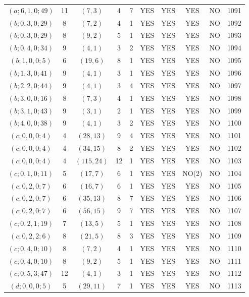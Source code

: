 \begin{longtable}{|c|c|c|c|c|c|c|c|c|c|}
$(a; 6, 1, 0; 49)$ & 11 & $(7, 3)$ & 4 & 7 & YES & YES & YES & NO & 1091\\
$(b; 0, 3, 0; 29)$ & 8 & $(7, 2)$ & 4 & 1 & YES & YES & YES & NO & 1092\\
$(b; 0, 3, 0; 29)$ & 8 & $(9, 2)$ & 5 & 1 & YES & YES & YES & NO & 1093\\
$(b; 0, 4, 0; 34)$ & 9 & $(4, 1)$ & 3 & 2 & YES & YES & YES & NO & 1094\\
$(b; 1, 0, 0; 5)$ & 6 & $(19, 6)$ & 8 & 1 & YES & YES & YES & NO & 1095\\
$(b; 1, 3, 0; 41)$ & 9 & $(4, 1)$ & 3 & 1 & YES & YES & YES & NO & 1096\\
$(b; 2, 2, 0; 44)$ & 9 & $(4, 1)$ & 3 & 4 & YES & YES & YES & NO & 1097\\
$(b; 3, 0, 0; 16)$ & 8 & $(7, 3)$ & 4 & 1 & YES & YES & YES & NO & 1098\\
$(b; 3, 1, 0; 43)$ & 9 & $(3, 1)$ & 2 & 1 & YES & YES & YES & NO & 1099\\
$(b; 4, 0, 0; 38)$ & 9 & $(4, 1)$ & 3 & 2 & YES & YES & YES & NO & 1100\\
$(c; 0, 0, 0; 4)$ & 4 & $(28, 13)$ & 9 & 4 & YES & YES & YES & NO & 1101\\
$(c; 0, 0, 0; 4)$ & 4 & $(34, 15)$ & 8 & 2 & YES & YES & YES & NO & 1102\\
$(c; 0, 0, 0; 4)$ & 4 & $(115, 24)$ & 12 & 1 & YES & YES & YES & NO & 1103\\
$(c; 0, 1, 0; 11)$ & 5 & $(17, 7)$ & 6 & 1 & YES & YES & NO(2) & NO & 1104\\
$(c; 0, 2, 0; 7)$ & 6 & $(16, 7)$ & 6 & 1 & YES & YES & YES & NO & 1105\\
$(c; 0, 2, 0; 7)$ & 6 & $(35, 13)$ & 8 & 7 & YES & YES & YES & NO & 1106\\
$(c; 0, 2, 0; 7)$ & 6 & $(56, 15)$ & 9 & 7 & YES & YES & YES & NO & 1107\\
$(c; 0, 2, 1; 19)$ & 7 & $(13, 5)$ & 5 & 1 & YES & YES & YES & NO & 1108\\
$(c; 0, 2, 2; 6)$ & 8 & $(21, 5)$ & 8 & 3 & YES & YES & YES & NO & 1109\\
$(c; 0, 4, 0; 10)$ & 8 & $(7, 2)$ & 4 & 1 & YES & YES & YES & NO & 1110\\
$(c; 0, 4, 0; 10)$ & 8 & $(9, 2)$ & 5 & 1 & YES & YES & YES & NO & 1111\\
$(c; 0, 5, 3; 47)$ & 12 & $(4, 1)$ & 3 & 1 & YES & YES & YES & NO & 1112\\
$(d; 0, 0, 0; 5)$ & 5 & $(29, 11)$ & 7 & 1 & YES & YES & YES & NO & 1113\\

\end{longtable}
